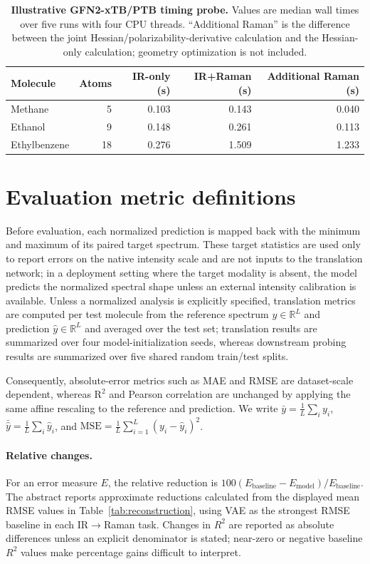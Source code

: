 \documentclass[pdflatex,sn-mathphys-num]{sn-jnl}%
\theoremstyle{thmstyleone}%
\theoremstyle{thmstyletwo}%
\theoremstyle{thmstylethree}%
\begin{document}
\begin{appendices}
\begin{table}[htbp]
\centering
\caption{\textbf{Illustrative GFN2-xTB/PTB timing probe.} Values are median wall times over five runs with four CPU threads. ``Additional Raman'' is the difference between the joint Hessian/polarizability-derivative calculation and the Hessian-only calculation; geometry optimization is not included.}
\label{tab:raman-timing}
\begin{tabular}{lrrrr}
\toprule
Molecule & Atoms & IR-only (s) & IR+Raman (s) & Additional Raman (s) \\
\midrule
Methane      & 5  & 0.103 & 0.143 & 0.040 \\
Ethanol      & 9  & 0.148 & 0.261 & 0.113 \\
Ethylbenzene & 18 & 0.276 & 1.509 & 1.233 \\
\bottomrule
\end{tabular}
\end{table}

\section{Evaluation metric definitions}\label{app:metricdefs}

Before evaluation, each normalized prediction is mapped back with the minimum and maximum of its paired target spectrum. These target statistics are used only to report errors on the native intensity scale and are not inputs to the translation network; in a deployment setting where the target modality is absent, the model predicts the normalized spectral shape unless an external intensity calibration is available. Unless a normalized analysis is explicitly specified, translation metrics are computed per test molecule from the reference spectrum $y\in\mathbb{R}^{L}$ and prediction $\hat y\in\mathbb{R}^{L}$ and averaged over the test set; translation results are summarized over four model-initialization seeds, whereas downstream probing results are summarized over five shared random train/test splits.


Consequently, absolute-error metrics such as MAE and RMSE are dataset-scale dependent, whereas $\text{R}^2$ and Pearson correlation are unchanged by applying the same affine rescaling to the reference and prediction. We write $\bar y=\tfrac1L\sum_i y_i$, $\bar{\hat y}=\tfrac1L\sum_i \hat y_i$, and $\mathrm{MSE}=\tfrac1L\sum_{i=1}^{L}(y_i-\hat y_i)^2$.

\paragraph{Relative changes.}
For an error measure $E$, the relative reduction is $100(E_{\mathrm{baseline}}-E_{\mathrm{model}})/E_{\mathrm{baseline}}$. The abstract reports approximate reductions calculated from the displayed mean RMSE values in Table~\ref{tab:reconstruction}, using VAE as the strongest RMSE baseline in each IR$\rightarrow$Raman task. Changes in $R^2$ are reported as absolute differences unless an explicit denominator is stated; near-zero or negative baseline $R^2$ values make percentage gains difficult to interpret.


\end{appendices}
\end{document}
